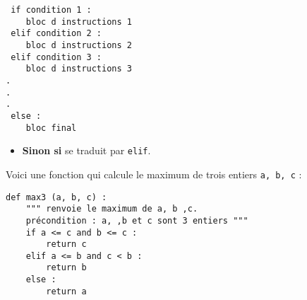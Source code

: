 %
%
%


\begin{lstlisting}
 if condition 1 :
	bloc d instructions 1
 elif condition 2 :
	bloc d instructions 2
 elif condition 3 :
	bloc d instructions 3
.
.
.
 else :
	bloc final
\end{lstlisting}

\begin{itemize}
 \item \textbf{Sinon si} se traduit par \texttt{elif}. 
\end{itemize}


Voici une fonction qui calcule le maximum de trois entiers \texttt{a, b, c} :
\begin{lstlisting}
def max3 (a, b, c) :
    """ renvoie le maximum de a, b ,c.
    précondition : a, ,b et c sont 3 entiers """
    if a <= c and b <= c :
        return c
    elif a <= b and c < b :
        return b
    else :
        return a
\end{lstlisting}

